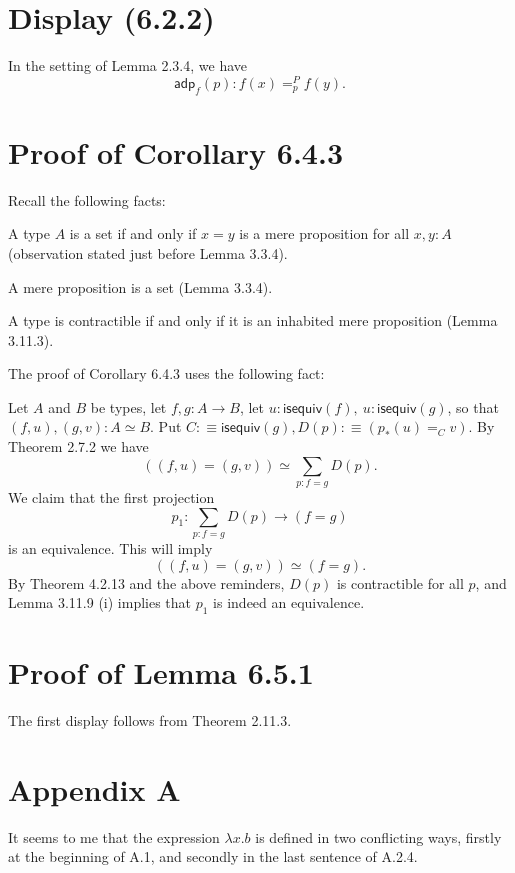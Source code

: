 \documentclass[12pt]{article}
\newcommand{\msf}{\mathsf}
\begin{document}

\section{Display (6.2.2)}

In the setting of Lemma 2.3.4, we have 
$$
\msf{adp}_f(p):f(x)=^P_pf(y).
$$


\section{Proof of Corollary 6.4.3}

Recall the following facts: 

A type $A$ is a set if and only if $x=y$ is a mere proposition for all $x,y:A$ (observation stated just before Lemma 3.3.4). 

A mere proposition is a set (Lemma 3.3.4).

A type is contractible if and only if it is an inhabited mere proposition (Lemma 3.11.3). 

The proof of Corollary 6.4.3 uses the following fact:

Let $A$ and $B$ be types, let $f,g:A\to B$, let $u:\mathsf{isequiv}(f),\ u:\mathsf{isequiv}(g)$, so that $(f,u),(g,v):A\simeq B$. Put $C:\equiv\mathsf{isequiv}(g), D(p):\equiv(p_*(u)=_Cv)$. By Theorem 2.7.2 we have 
$$
((f,u)=(g,v))\simeq\sum_{p:f=g}D(p).
$$ 
We claim that the first projection 
$$
p_1:\sum_{p:f=g}D(p)\to(f=g)
$$ 
is an equivalence. This will imply 
$$
((f,u)=(g,v))\simeq(f=g).
$$ 
By Theorem 4.2.13 and the above reminders, $D(p)$ is contractible for all $p$, and Lemma 3.11.9 (i) implies that $p_1$ is indeed an equivalence.


\section{Proof of Lemma 6.5.1}

The first display follows from Theorem 2.11.3.


\section{Appendix A}

It seems to me that the expression $\lambda x.b$ is defined in two conflicting ways, firstly at the beginning of A.1, and secondly in the last sentence of A.2.4. 
\end{document}
